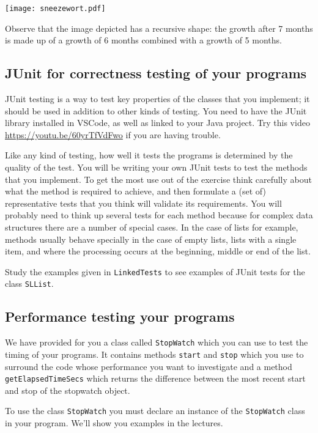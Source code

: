 \documentclass[twoside=false,DIV=14]{scrartcl}
\begin{document}
\begin{center}
\texttt{[image: sneezewort.pdf]}
\end{center}

Observe that the image depicted has a recursive shape: the growth after 7 months is made up of a growth of 6 months combined with a growth of 5 months.


\subsection*{JUnit for correctness testing of your programs}

JUnit testing is a way to test key properties of the classes that you implement; it should be used in addition to other kinds of testing.   You need to have the JUnit library installed in VSCode, as well as linked to your Java project.  Try this video \url{https://youtu.be/60yrTfVdFwo} if you are having trouble.

Like any kind of testing, how well it tests the programs is determined by the quality of the test.  You will be writing your own JUnit tests to test the methods that you implement. To get the most use out of the exercise think carefully about what the method is required to  achieve, and then formulate a (set of) representative tests that you think will validate its requirements. You will probably need to think up several tests for each method because for complex data structures there are a number of special cases. In the case of lists for example, methods usually behave specially in the case of empty lists, lists with a single item, and where the processing occurs at the beginning, middle or end of the list.

Study the examples given in  {\tt LinkedTests} to see examples of JUnit tests for the class {\tt SLList}.

\subsection*{Performance testing your programs}

We have provided for you a class called {\tt StopWatch} which you can use to test the timing of your programs. It contains methods {\tt start} and {\tt stop} which you use to surround the code whose performance you want to investigate and a method {\tt getElapsedTimeSecs} which returns the difference between the most recent start and stop of the stopwatch object.

To use the class {\tt StopWatch} you must declare an instance of the {\tt StopWatch} class in your program. We'll show you examples in the lectures.
\end{document}
